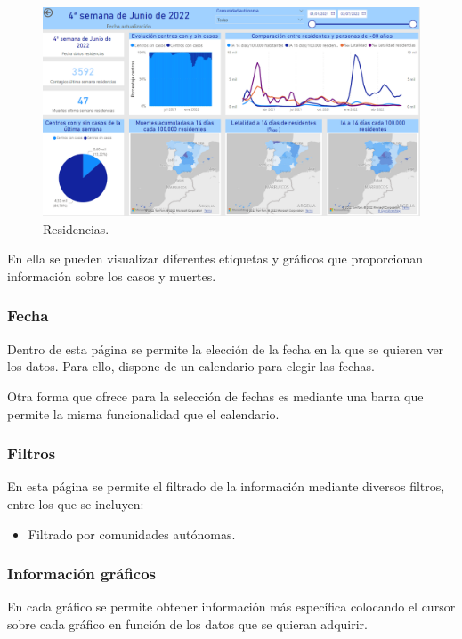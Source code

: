 \begin{figure}[h]
    \advance{} 
    \includegraphics[scale=0.55]{img/powerBI_residencias.PNG}
    \caption{Residencias.}
\end{figure}
\newpage

En ella se pueden visualizar diferentes etiquetas y gráficos que proporcionan información sobre los casos y muertes.
\newpage
\subsubsection{Fecha}
Dentro de esta página se permite la elección de la fecha en la que se quieren ver los datos.
Para ello, dispone de un calendario para elegir las fechas.

Otra forma que ofrece para la selección de fechas es mediante una barra que permite la misma funcionalidad que el calendario.

\subsubsection{Filtros}
En esta página se permite el filtrado de la información mediante diversos filtros, entre los que se incluyen:
\begin{itemize}
    \item Filtrado por comunidades autónomas.
\end{itemize}
\newpage
\subsubsection{Información gráficos}
En cada gráfico se permite obtener información más específica colocando el cursor sobre cada gráfico en función de los datos que se quieran adquirir.
